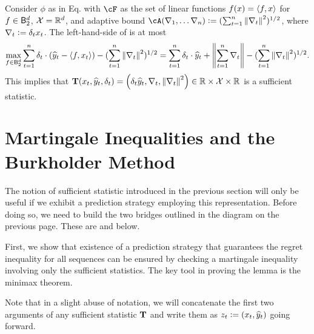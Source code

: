 \begin{example}
	Consider $\phi$ as in Eq.  with $\cF$ as the set of linear functions $f(x)=\left\langle f,x \right\rangle$ for $f\in {\mathsf B}_2^d$, $\mathcal{X}={\mathbb R}^d$, and adaptive bound $\cA(\nabla_{1},\ldots\nabla_n) \ldef (\sum_{t=1}^n \norm{\nabla_t}^2)^{1/2}$, where $\nabla_t \vcentcolon= \delta_t x_t$. The left-hand-side of  is at most
	\begin{equation}\max_{f\in {\mathsf B}_2^d}\sum_{t=1}^n \delta_t \cdot ({\widehat{y}}_t-\left\langle f,x_t \right\rangle) - (\sum_{t=1}^n \left\|\nabla_t\right\|^2)^{1/2} = \sum_{t=1}^n \delta_t \cdot {\widehat{y}}_t+\left\|\sum_{t=1}^n \nabla_t\right\| - (\sum_{t=1}^n \left\|\nabla_t\right\|^2)^{1/2}.
	\label{eq:adaptive}\end{equation}
	This implies that $\mathbf{T}(x_t,{\widehat{y}}_t,\delta_t) = \left( \delta_t{\widehat{y}}_t, \nabla_t, \left\|\nabla_t\right\|^2 \right)\in{\mathbb R}\times \mathcal{X}\times {\mathbb R}$ is a sufficient statistic.
\end{example}

\section{Martingale Inequalities and the Burkholder Method}
\label{sec:burkholder}

The notion of sufficient statistic introduced in the previous section will only be useful if we exhibit a prediction strategy employing this representation. Before doing so, we need to build the two bridges outlined in the diagram on the previous page.
These are  and  below.

First, we show that existence of a prediction strategy that guarantees the regret inequality  for all sequences can be ensured by checking a martingale inequality involving only the sufficient statistics. The key tool in proving the lemma is the minimax theorem. 

Note that in a slight abuse of notation, we will concatenate the first two arguments of any sufficient statistic $\mathbf{T}$ and write them as $z_{t}\vcentcolon=(x_t, {\widehat{y}}_t)$ going forward.

